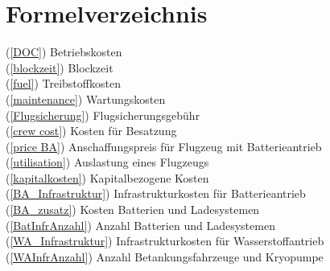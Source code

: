 \chapter{Formelverzeichnis}
\label{ch:Formelverzeichnis}
(\ref{DOC}) Betriebskosten \\
(\ref{blockzeit}) Blockzeit \\
(\ref{fuel}) Treibstoffkosten \\
(\ref{maintenance}) Wartungskosten \\
(\ref{Flugsicherung}) Flugsicherungsgebühr \\
(\ref{crew cost}) Kosten für Besatzung \\
(\ref{price BA}) Anschaffungspreis für Flugzeug mit Batterieantrieb \\
(\ref{utilisation}) Auslastung eines Flugzeugs \\
(\ref{kapitalkosten}) Kapitalbezogene Kosten \\
(\ref{BA_Infrastruktur}) Infrastrukturkosten für Batterieantrieb \\
(\ref{BA_zusatz}) Kosten Batterien und Ladesystemen \\
(\ref{BatInfrAnzahl}) Anzahl Batterien und Ladesystemen \\
(\ref{WA_Infrastruktur}) Infrastrukturkosten für Wasserstoffantrieb \\
(\ref{WAInfrAnzahl}) Anzahl Betankungsfahrzeuge und Kryopumpe \\

